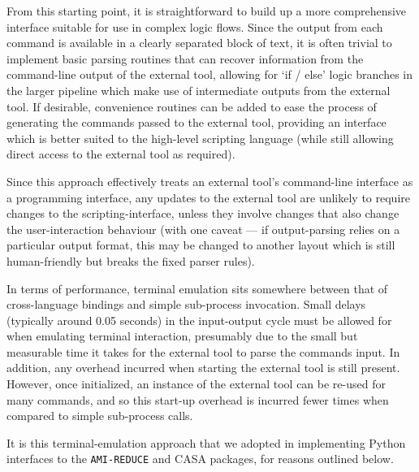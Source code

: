 \documentclass[5p,authoryear]{elsarticle}
\begin{document}
From this starting point, it is straightforward to build up a more comprehensive interface suitable for use in complex logic flows. Since the output from each command is available in a clearly separated block of text, it is often trivial to implement basic parsing routines that can recover information from the command-line output of the external tool, allowing for `if / else' logic branches in the larger pipeline which make use of intermediate outputs from the external tool. 
If desirable, convenience routines can be added to ease the process of generating the commands passed to the external tool, providing an interface which is better suited to the high-level scripting language (while still allowing direct access to the external tool as required).

Since this approach effectively treats an external tool's command-line interface as a programming interface, any updates to the external tool are unlikely to require changes to the scripting-interface, unless they involve changes that also change the user-interaction behaviour (with one caveat --- if output-parsing relies on a particular output format, this may be changed to another layout which is still human-friendly but breaks the fixed parser rules).

In terms of performance, terminal emulation sits somewhere between that of cross-language bindings and simple sub-process invocation. 
Small delays (typically around 0.05 seconds) in the input-output cycle must be allowed for when emulating terminal interaction, presumably due to the small but measurable time it takes for the external tool to parse the commands input. In addition, any overhead incurred when starting the external tool is still present. 
However, once initialized, an instance of the external tool can be re-used for many commands, and so this start-up overhead is incurred fewer times when compared to simple sub-process calls. 


It is this terminal-emulation approach that we adopted in implementing Python interfaces to the \texttt{AMI-REDUCE} and CASA packages, for reasons outlined below.
\end{document}
